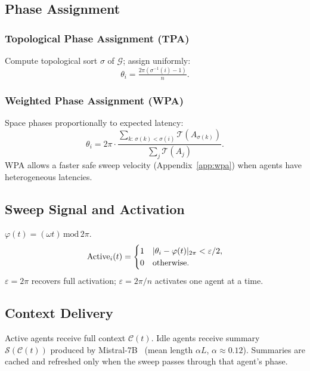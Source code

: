 \documentclass[10pt,twocolumn]{article}
\theoremstyle{plain}
\theoremstyle{definition}
\theoremstyle{remark}
\newcommand{\G}{\mathcal{G}}
\newcommand{\Ccost}{\mathcal{C}}
\newcommand{\T}{\mathcal{T}}
\newcommand{\eps}{\varepsilon}
\newcommand{\phase}{\theta}
\newcommand{\sweep}{\varphi}
\newcommand{\sweepvel}{\omega}
\DeclarePairedDelimiter{\abs}{\lvert}{\rvert}
\newcommand{\circabs}[1]{\abs{#1}_{2\pi}}
\begin{document}
\subsection{Phase Assignment}
\label{sec:phase}

\subsubsection{Topological Phase Assignment (TPA)}
Compute topological sort $\sigma$ of $\G$; assign uniformly:
\begin{equation}
  \phase_i = \tfrac{2\pi(\sigma^{-1}(i)-1)}{n}.
  \label{eq:tpa}
\end{equation}

\subsubsection{Weighted Phase Assignment (WPA)}
Space phases proportionally to expected latency:
\begin{equation}
  \phase_i = 2\pi\cdot
  \frac{\sum_{k:\,\sigma(k)<\sigma(i)}\T(A_{\sigma(k)})}{\sum_j \T(A_j)}.
  \label{eq:wpa}
\end{equation}
WPA allows a faster safe sweep velocity (Appendix~\ref{app:wpa}) when
agents have heterogeneous latencies.

\subsection{Sweep Signal and Activation}

$\sweep(t)=(\sweepvel t)\,\mathrm{mod}\,2\pi$.
\begin{equation}
  \mathrm{Active}_i(t)=
  \begin{cases}1&\circabs{\phase_i-\sweep(t)}<\eps/2,\\0&\text{otherwise.}\end{cases}
  \label{eq:activation}
\end{equation}
$\eps=2\pi$ recovers full activation; $\eps=2\pi/n$ activates one agent
at a time.

\subsection{Context Delivery}
Active agents receive full context $\Ccost(t)$.  Idle agents receive
summary $\mathcal{S}(\Ccost(t))$ produced by Mistral-7B~\citep{jiang2023mistral}
(mean length $\alpha L$, $\alpha\approx0.12$).  Summaries are cached
and refreshed only when the sweep passes through that agent's phase.
\end{document}
